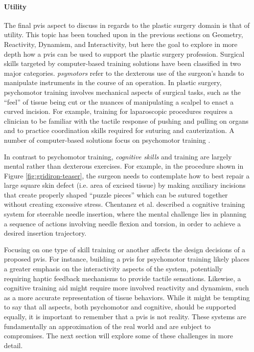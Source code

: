 \documentclass[12pt,oneside,letterpaper]{memoir}
\begin{document}
\paragraph{Utility} The final \gls{pvis} aspect to discuss in regards
to the plastic surgery domain is that of utility. This topic has been
touched upon in the previous sections on Geometry, Reactivity,
Dynamism, and Interactivity, but here the goal to explore in more
depth how a \gls{pvis} can be used to support the plastic surgery
profession. Surgical skills targeted by computer-based training
solutions have been classified \cite{GallaRCHFMSS:2005} in two major
categories. \emph{\Glspl{psymotor}} refer to the dexterous use of
the surgeon's hands to manipulate instruments in the course of an
operation. In plastic surgery, psychomotor training involves
mechanical aspects of surgical tasks, such as the ``feel''
of tissue being cut or the nuances of manipulating a scalpel to enact
a curved incision. For example, training for laparoscopic procedures
requires a clinician to be familiar with the tactile response of
pushing and pulling on organs and to practice coordination
skills required for suturing and cauterization.  A number of
computer-based solutions focus on psychomotor training
\cite{MendoL:2003,DeKLS:2005,KimCDS:2007,LindbT:2007}.

In contrast to psychomotor training, \emph{cognitive skills} and
training are largely mental rather than dexterous exercises. For
example, in the procedure shown in Figure \ref{fig:gridiron-teaser},
the surgeon needs to contemplate how to best repair a large square
skin defect (i.e. area of excised tissue) by making auxiliary
incisions that create properly shaped ``puzzle pieces'' which can be
sutured together without creating excessive stress. Chentanez et al.\!
 described a cognitive training system
for steerable needle insertion, where the mental challenge lies in
planning a sequence of actions involving needle flexion and torsion,
in order to achieve a desired insertion trajectory.

Focusing on one type of skill training or another affects the design
decisions of a proposed \gls{pvis}. For instance, building a
\gls{pvis} for psychomotor training likely places a greater emphasis
on the interactivity aspects of the system, potentially requiring
haptic feedback mechanisms to provide tactile sensations. Likewise, a
cognitive training aid might require more involved reactivity and
dynamism, such as a more accurate representation of tissue
behaviors. While it might be tempting to say that all aspects, both
psychomotor and cognitive, should be supported equally, it is
important to remember that a \gls{pvis} is not reality. These systems
are fundamentally an approximation of the real world and are subject
to compromises. The next section will explore some of these challenges
in more detail. 
\end{document}
